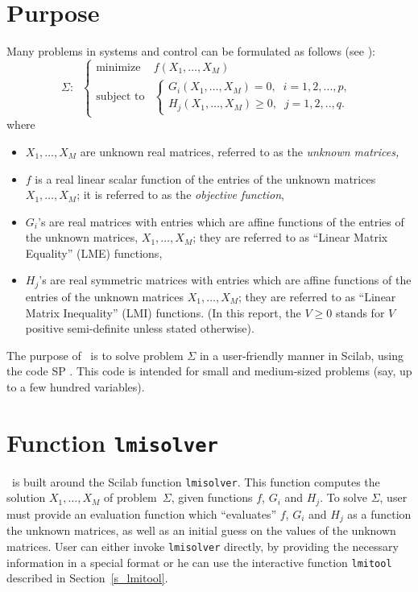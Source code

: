 \section{Purpose}
Many problems in systems and control can be formulated as follows 
(see \cite{BEFB:94}): 
\[
\Sigma : \;\; \left\{
\begin{array}{ll}
\mbox{minimize}    &  f(X_1,\ldots,X_M) \\
\mbox{subject to}  & \left\{ \begin{array}{l}
               G_i(X_1,\ldots,X_M) = 0, \;\;i=1,2,...,p,\\
                H_j(X_1,\ldots,X_M) \geq 0, \;\;j=1,2,..,q. 
                              \end{array} \right.
\end{array}
\right.
\]
where 
\begin{itemize}
\item
$X_1,\ldots,X_M$ are unknown real matrices, referred to as the {\em
unknown matrices,} 
\item
$f$ is a real linear scalar function of the entries of the unknown
matrices $X_1,\ldots,X_M$; it is referred to as the {\em objective function},
\item
$G_i$'s are real matrices with entries which are affine functions of the 
entries of the unknown matrices, $X_1,\ldots,X_M$;
they are referred to as  ``Linear Matrix Equality'' (LME) functions, 
\item
$H_j$'s are real symmetric matrices with entries which are affine functions
of the entries of the unknown matrices $X_1,\ldots,X_M$; they are referred to as  
``Linear Matrix Inequality'' (LMI) functions.  (In this report, 
the  $V \geq 0$ stands for $V$ positive semi-definite unless stated otherwise).  
\end{itemize}
The purpose of \lmitool\ is to solve problem $\Sigma$ in a user-friendly manner
in Scilab, using the code SP \cite{sp}. This code is intended for
small and medium-sized problems (say, up to a few hundred variables).

\section{Function {\tt lmisolver}}

\lmitool\ is built around the Scilab function {\tt lmisolver}.  This
function computes the solution $X_1,\ldots,X_M$ of
problem~$\Sigma$, given functions $f$, $G_i$ and $H_j$. To solve
$\Sigma$, user must provide an evaluation function which 
``evaluates'' $f$, $G_i$ and $H_j$ as a function the unknown matrices,
as well as an initial guess on the values of the unknown matrices.  User can either 
invoke {\tt lmisolver} directly, by providing the necessary information in a
special format or he can use the interactive
function {\tt lmitool} described in Section~\ref{s_lmitool}.

